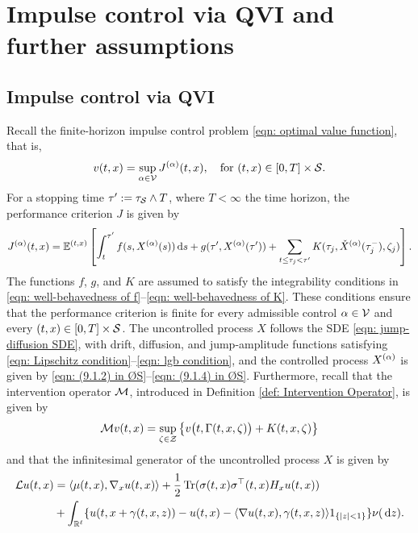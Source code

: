 \section{Impulse control via QVI and further assumptions}
\label{section: Impulse Control via QVI and Further Assumptions}
\subsection{Impulse control via QVI}
Recall the finite-horizon impulse control problem \eqref{eqn: optimal value function}, that is,
\begin{equation}
    v(t,x) = \sup_{\alpha \in \mathcal{V}} J^{(\alpha)}(t,x), \quad \text{for } (t,x)\in [0,T]\times \mathcal{S}.
    \label{eqn: impulse control problem}
\end{equation}
For a stopping time $\tau':=\tau_{\mathcal{S}} \wedge T$, where $T<\infty$ the time horizon, the performance criterion $J$ is given by
\begin{equation*}
    J^{(\alpha)}(t,x) = \mathbb{E}^{(t,x)} \left[ \int_t^{\tau'} f(s,X^{(\alpha)}(s)) \,\mathrm{d} s + g(\tau', X^{(\alpha)}(\tau')) + \sum_{t \leq \tau_j < \tau'} K(\tau_j, \check{X}^{(\alpha)}(\tau_j^-), \zeta_j) \right].
\end{equation*}
The functions $f$, $g$, and $K$ are assumed to satisfy the integrability conditions in \eqref{eqn: well-behavedness of f}–\eqref{eqn: well-behavedness of K}. These conditions ensure that the performance criterion is finite for every admissible control $\alpha \in \mathcal{V}$ and every $(t,x) \in [0,T] \times \mathcal{S}$. The uncontrolled process $X$ follows the SDE \eqref{eqn: jump-diffusion SDE}, with drift, diffusion, and jump-amplitude functions satisfying \eqref{eqn: Lipschitz condition}--\eqref{eqn: lgb condition}, and the controlled process $X^{(\alpha)}$ is given by \eqref{eqn: (9.1.2) in ØS}--\eqref{eqn: (9.1.4) in ØS}. Furthermore, recall that the intervention operator $\mathcal{M}$, introduced in Definition \ref{def: Intervention Operator}, is given by
\begin{equation*}
    \mathcal{M} v(t,x) = \sup_{\zeta \in \mathcal{Z}} \big\{ v\big(t,\Gamma(t,x,\zeta)\big) + K(t,x,\zeta) \big\}
\end{equation*}
and that the infinitesimal generator of the uncontrolled process $X$ is given by
\begin{align}
    \mathcal{L} u(t,x) &= \langle \mu(t,x), \nabla_x u(t,x) \rangle + \frac{1}{2} \operatorname{Tr} (\sigma(t,x)\sigma^\top(t,x)H_xu(t,x)) \nonumber\\
    &+ \int_{\mathbb{R}^\ell} \{u(t,x+\gamma(t,x,z)) - u(t,x) - \langle \nabla u(t,x), \gamma(t,x,z) \rangle 1_{\left\{|z|<1\right\}}\} \nu(\,\mathrm{d} z).
    \label{eqn: infinitesimal generator (short form)}
\end{align}
